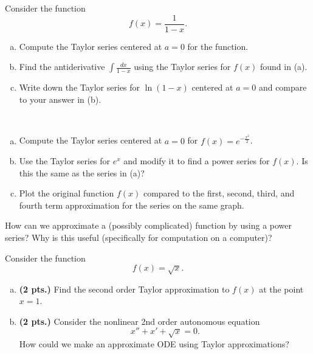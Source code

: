 \begin{problem} Consider the function
\[
f(x)=\frac{1}{1-x}.
\]
\begin{enumerate}[(a)]
    \item Compute the Taylor series centered at $a=0$ for the function.
    \item Find the antiderivative $\int \frac{dx}{1-x}$ using the Taylor series for $f(x)$ found in (a).
    \item Write down the Taylor series for $\ln(1-x)$ centered at $a=0$ and compare to your answer in (b).
\end{enumerate}
\end{problem}

\begin{problem}~
\begin{enumerate}[(a)]
    \item Compute the Taylor series centered at $a=0$ for $f(x)=e^{-\frac{x^2}{2}}$.
    \item Use the Taylor series for $e^x$ and modify it to find a power series for $f(x)$. Is this the same as the series in (a)?
    \item Plot the original function $f(x)$ compared to the first, second, third, and fourth term approximation for the series on the same graph.
\end{enumerate}
\end{problem}

\begin{problem}
How can we approximate a (possibly complicated) function by using a power series? Why is this useful (specifically for computation on a computer)?
\end{problem}

\begin{problem} Consider the function
\[
f(x)=\sqrt{x}.
\]
\begin{enumerate}[(a)]
\item \textbf{(2 pts.)} Find the second order Taylor approximation to $f(x)$ at the point $x=1$.
\item \textbf{(2 pts.)} Consider the nonlinear 2$\textrm{nd}$ order autonomous equation
\[
x'' + x' + \sqrt{x} = 0.
\]
How could we make an approximate ODE using Taylor approximations?
\end{enumerate}
\end{problem}

